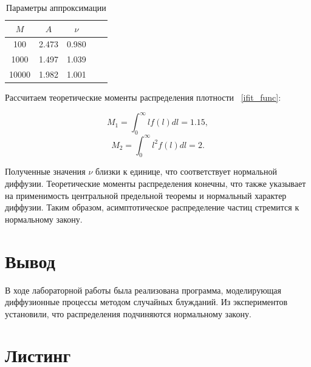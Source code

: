 \documentclass[14pt,a4paper]{extarticle}
\theoremstyle{plain}
\begin{document}
	\begin{table}[h!]
		\centering
		\caption{Параметры аппроксимации}
		\label{tab:result}
		\renewcommand{\arraystretch}{1.5}
		\begin{tabular}{|c|c|c|c|p{4cm}|}
			\hline
			$M$ & $A$ & $\nu$ \\
			\hline
			100  & 2.473 & 0.980 \\
			\hline
			1000 & 1.497 & 1.039 \\
			\hline
			10000& 1.982 & 1.001 \\
			\hline
		\end{tabular}
	\end{table}
	
	Рассчитаем теоретические моменты распределения плотности ~\eqref{ifit_func}:
	
	\begin{equation}
		M_1 = \int_{0}^{\infty} l f(l) dl = 1.15,
		\nonumber
	\end{equation}
	\begin{equation}
		M_2 = \int_{0}^{\infty} l^2 f(l) dl = 2.
		\nonumber
	\end{equation}
	
	Полученные значения $\nu$ близки к единице, что соответствует нормальной диффузии. Теоретические моменты распределения конечны, что также указывает на применимость центральной предельной теоремы и нормальный характер диффузии. Таким образом, асимптотическое распределение частиц стремится к нормальному закону.
	
	\newpage
	\section{Вывод}
	
	В ходе лабораторной работы была реализована программа, моделирующая диффузионные процессы методом случайных блужданий. Из экспериментов установили, что распределения подчиняются нормальному закону.
	
	\newpage
	\section{Листинг}
	
\end{document}
